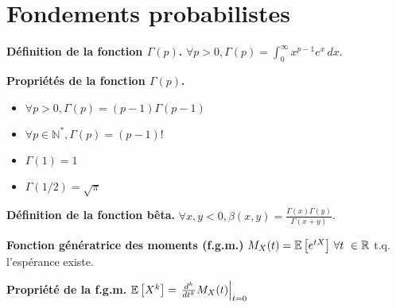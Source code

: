 \section{Fondements probabilistes}
\textbf{Définition de la fonction $\Gamma(p)$.} $\forall p > 0, \Gamma(p) = \int_0^\infty x^{p-1}e^x \, dx$.

\textbf{Propriétés de la fonction $\Gamma(p)$.}
\begin{itemize}
	\item $\forall p > 0, \Gamma(p) = (p-1)\Gamma(p-1)$
	\item $\forall p \in \mathbb{N}^*, \Gamma(p) = (p-1)!$
	\item $\Gamma(1)=1$
	\item $\Gamma(1/2)=\sqrt{\pi}$
\end{itemize}

\textbf{Définition de la fonction bêta.}  $\forall x,y<0, \beta(x,y)=\frac{\Gamma(x)\Gamma(y)}{\Gamma(x+y)}$.

\textbf{Fonction génératrice des moments (f.g.m.)} $M_X(t)=\e{e^{tX}} \, \forall t \in \mathbb{R}$ t.q. l'espérance existe.

\textbf{Propriété de la f.g.m.} $\mathbb{E}\left[{X^k}\right] = \left.\frac{d^k}{dt^k}M_X(t)\right|_{t=0}$